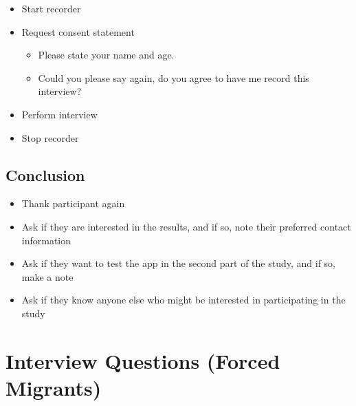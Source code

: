 \begin{itemize}    \item Start recorder
    \item Request consent statement
    \begin{itemize}
        \item Please state your name and age.
        \item Could you please say again, do you agree to have me record this interview?
    \end{itemize}
    \item Perform interview
    \item Stop recorder
\end{itemize}

\subsection*{Conclusion}

\begin{itemize}
    \item Thank participant again
    \item Ask if they are interested in the results, and if so, note their preferred contact information
    \item Ask if they want to test the app in the second part of the study, and if so, make a note
    \item Ask if they know anyone else who might be interested in participating in the study
\end{itemize}


\section{Interview Questions (Forced Migrants)}
\label{app:interview-questions-fm}

